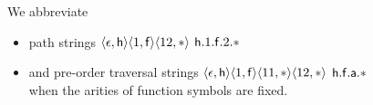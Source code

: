 
\begin{notation}
	We abbreviate
	\begin{itemize}
		\pause
		\item path strings
		$\langle\epsilon,{\mathsf h}\rangle\langle1,{\mathsf f}\rangle\langle12,*\rangle$
		\hfill ${\mathsf h}.1.{\mathsf f}.2.{*}$
		\pause
		\item and pre-order traversal strings
		$\langle\epsilon,{\mathsf h}\rangle\langle1,{\mathsf f}\rangle\langle11,*\rangle\langle12,*\rangle$
		\hfill ${\mathsf h}.{\mathsf f}.{\mathsf a}.{*}$
		\pause\\
		when the arities of function symbols are fixed.
	\end{itemize}
\end{notation}